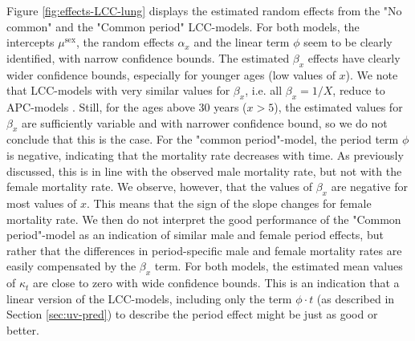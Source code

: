 \newpar Figure \ref{fig:effects-LCC-lung} displays the estimated random effects from the "No common" and the "Common period" LCC-models. For both models, the intercepts $\mu^{\text{sex}}$, the random effects $\alpha_x$ and the linear term $\phi$ seem to be clearly identified, with narrow confidence bounds. The estimated $\beta_x$ effects have clearly wider confidence bounds, especially for younger ages (low values of $x$). We note that LCC-models with very similar values for $\beta_x$, i.e. all $\beta_x = 1/X$, reduce to APC-models \parencite{Wisniowski2015}. Still, for the ages above 30 years ($x > 5$), the estimated values for $\beta_x$ are sufficiently variable and with narrower confidence bound, so we do not conclude that this is the case. For the "common period"-model, the period term $\phi$ is negative, indicating that the mortality rate decreases with time. As previously discussed, this is in line with the observed male mortality rate, but not with the female mortality rate. We observe, however, that the values of $\beta_x$ are negative for most values of $x$. This means that the sign of the slope changes for female mortality rate. We then do not interpret the good performance of the "Common period"-model as an indication of similar male and female period effects, but rather that the differences in period-specific male and female mortality rates are easily compensated by the $\beta_x$ term. For both models, the estimated mean values of $\kappa_t$ are close to zero with wide confidence bounds. This is an indication that a linear version of the LCC-models, including only the term $\phi \cdot t$ (as described in Section \ref{sec:uv-pred}) to describe the period effect might be just as good or better. 

